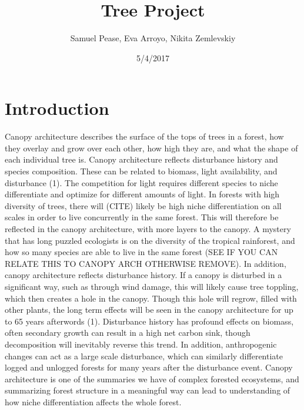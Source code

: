\documentclass[10pt]{article}
\title{Tree Project}
\author{Samuel Pease, Eva Arroyo, Nikita Zemlevskiy}
\date{5/4/2017}
\begin{document}
\maketitle
\newpage
\section*{Introduction}

Canopy architecture describes the surface of the tops of trees in a forest, how they overlay and grow over each other, how high they are, and what the shape of each individual tree is. Canopy architecture reflects disturbance history and species composition. These can be related to biomass, light availability, and disturbance (1).  The competition for light requires different species to niche differentiate and optimize for different amounts of light. In forests with high diversity of trees, there will (CITE) likely be high niche differentiation on all scales in order to live concurrently in the same forest. This will therefore be reflected in the canopy architecture, with more layers to the canopy. A mystery that has long puzzled ecologists is on the diversity of the tropical rainforest, and how so many species are able to live in the same forest (SEE IF YOU CAN RELATE THIS TO CANOPY ARCH OTHERWISE REMOVE). In addition, canopy architecture reflects disturbance history. If a canopy is disturbed in a significant way, such as through wind damage, this will likely cause tree toppling, which then creates a hole in the canopy. Though this hole will regrow, filled with other plants, the long term effects will be seen in the canopy architecture for up to 65 years afterwords (1). Disturbance history has profound effects on biomass, often secondary growth can result in a high net carbon sink, though decomposition will inevitably reverse this trend. In addition, anthropogenic changes can act as a large scale disturbance, which can similarly differentiate logged and unlogged forests for many years after the disturbance event. Canopy architecture is one of the summaries we have of complex forested ecosystems, and summarizing forest structure in a meaningful way can lead to understanding of how niche differentiation affects the whole forest.
\end{document}
